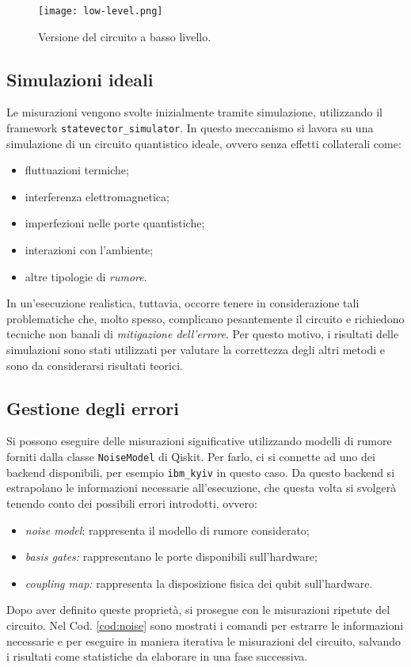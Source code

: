 \begin{figure}[ht]
    \texttt{[image: low-level.png]}
    \caption{Versione del circuito a basso livello.}
		\label{fig:circuito-2x2}
\end{figure}

\subsection{Simulazioni ideali}
Le misurazioni vengono svolte inizialmente tramite simulazione, utilizzando 
il framework \texttt{statevector\_simulator}. In questo meccanismo si lavora su 
una simulazione di un circuito quantistico ideale, ovvero senza effetti collaterali come:
\begin{itemize}
    \item fluttuazioni termiche;
    \item interferenza elettromagnetica;
    \item imperfezioni nelle porte quantistiche;
    \item interazioni con l'ambiente;
    \item altre tipologie di \textit{rumore}.
\end{itemize}
In un'esecuzione realistica, tuttavia, occorre tenere in considerazione
tali problematiche che, molto spesso, complicano pesantemente
il circuito e richiedono tecniche non banali di \textit{mitigazione dell'errore}.
Per questo motivo, i risultati delle simulazioni sono stati utilizzati per 
valutare la correttezza degli altri metodi e sono da considerarsi risultati teorici.

\subsection{Gestione degli errori}
Si possono eseguire delle misurazioni significative utilizzando modelli 
di rumore forniti dalla classe \texttt{NoiseModel} di Qiskit. 
Per farlo, ci si connette ad uno dei backend disponibili, per esempio 
\texttt{ibm\_kyiv} in questo caso. Da questo backend si estrapolano le 
informazioni necessarie all'esecuzione, che questa volta si svolgerà
tenendo conto dei possibili errori introdotti, ovvero:
\begin{itemize}
	\item \emph{noise model}: rappresenta il modello di rumore considerato;
		\item \emph{basis gates:} rappresentano le porte disponibili sull'hardware;
		\item \emph{coupling map:} rappresenta la disposizione fisica dei qubit sull'hardware.
\end{itemize}
Dopo aver definito queste proprietà, si prosegue con le misurazioni 
ripetute del circuito. Nel Cod. \ref{cod:noise} sono mostrati 
i comandi per estrarre le informazioni necessarie e per eseguire 
in maniera iterativa le misurazioni del circuito, salvando i risultati 
come statistiche da elaborare in una fase successiva.

